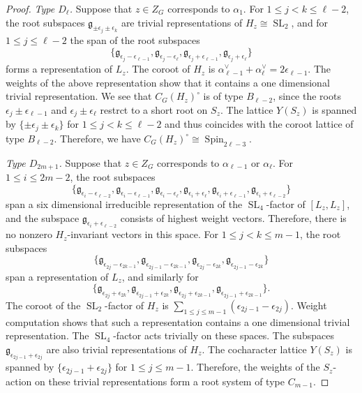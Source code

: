 \documentclass[11pt,oneside,dvipsnames]{amsart}
\theoremstyle{plain}
\theoremstyle{definition}
\theoremstyle{named}
\DeclareMathOperator{\SL}{SL}
\DeclareMathOperator{\Spin}{Spin}
\begin{document}
\begin{proof}
\textit{Type $D_{\ell}$.} Suppose that $z\in Z_G$ corresponds to $\alpha_1$. For $1\le j<k\le \ell-2$, the root subspaces $\mathfrak{g}_{\pm\epsilon_j\pm\epsilon_k}$ are trivial representations of $H_z\cong\SL_2$, and for $1\le j\le \ell-2$ the span of the root subspaces
$$
\{\mathfrak{g}_{\epsilon_j-\epsilon_{\ell-1}},\mathfrak{g}_{\epsilon_j-\epsilon_{\ell}},\mathfrak{g}_{\epsilon_j+\epsilon_{\ell-1}},\mathfrak{g}_{\epsilon_j+\epsilon_{\ell}}\}
$$
forms a representation of $L_z$. The coroot of $H_z$ is $\alpha_{\ell-1}^{\vee}+\alpha_{\ell}^{\vee}=2\epsilon_{\ell-1}$. The weights of the above representation show that it contains a one dimensional trivial representation. We see that $C_G(H_z)^{\circ}$ is of type $B_{\ell-2}$, since the roots $\epsilon_j\pm\epsilon_{\ell-1}$ and $\epsilon_j\pm\epsilon_{\ell}$ restrct to a short root on $S_z$. The lattice $Y(S_z)$ is spanned by $\{\pm\epsilon_j\pm\epsilon_k\}$ for $1\le j<k\le \ell-2$ and thus coincides with the coroot lattice of type $B_{\ell-2}$. Therefore, we have $C_G(H_z)^{\circ}\cong \Spin_{2\ell-3}$. 

\textit{Type $D_{2m+1}$.} Suppose that $z\in Z_G$ corresponds to $\alpha_{\ell-1}$ or $\alpha_{\ell}$. For $1\le i\le 2m-2$, the root subspaces
\begin{equation}\label{eq-Thm-Cent-H_z-D2m+1}
\{\mathfrak{g}_{\epsilon_i-\epsilon_{\ell-2}},\mathfrak{g}_{\epsilon_i-\epsilon_{\ell-1}},\mathfrak{g}_{\epsilon_i-\epsilon_{\ell}},\mathfrak{g}_{\epsilon_i+\epsilon_{\ell}},\mathfrak{g}_{\epsilon_i+\epsilon_{\ell-1}},\mathfrak{g}_{\epsilon_i+\epsilon_{\ell-2}}\}
\end{equation}
span a six dimensional irreducible representation of the $\SL_4$-factor of $[L_z,L_z]$, and the subspace $\mathfrak{g}_{\epsilon_i+\epsilon_{\ell-2}}$ consists of highest weight vectors. Therefore, there is no nonzero $H_z$-invariant vectors in this space. For $1\le j<k\le m-1$, the root subspaces
$$
\{\mathfrak{g}_{\epsilon_{2j}-\epsilon_{2k-1}},\mathfrak{g}_{\epsilon_{2j-1}-\epsilon_{2k-1}},\mathfrak{g}_{\epsilon_{2j}-\epsilon_{2k}},\mathfrak{g}_{\epsilon_{2j-1}-\epsilon_{2k}}\}
$$
span a representation of $L_z$, and similarly for
$$
\{\mathfrak{g}_{\epsilon_{2j}+\epsilon_{2k}},\mathfrak{g}_{\epsilon_{2j-1}+\epsilon_{2k}},\mathfrak{g}_{\epsilon_{2j}+\epsilon_{2k-1}},\mathfrak{g}_{\epsilon_{2j-1}+\epsilon_{2k-1}}\}.
$$
The coroot of the $\SL_2$-factor of $H_z$ is $\sum_{1\le j\le m-1}(\epsilon_{2j-1}-\epsilon_{2j})$. Weight computation shows that such a representation contains a one dimensional trivial representation. The $\SL_4$-factor acts trivially on these spaces. The subspaces $\mathfrak{g}_{\epsilon_{2j-1}+\epsilon_{2j}}$ are also trivial representations of $H_z$. The cocharacter lattice $Y(S_z)$ is spanned by $\{\epsilon_{2j-1}+\epsilon_{2j}\}$ for $1\le j\le m-1$. Therefore, the weights of the $S_z$-action on these trivial representations form a root system of type $C_{m-1}$.


\end{proof}
\end{document}
